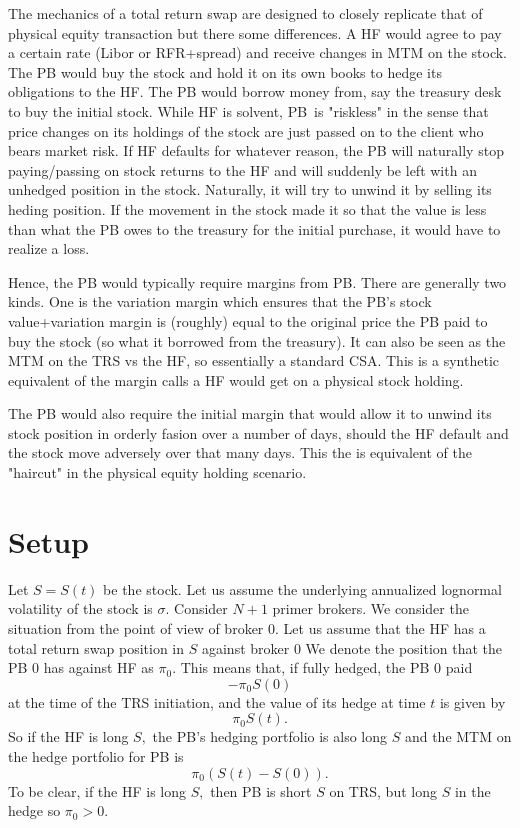 \documentclass{article}
\begin{document}
The mechanics of a total return swap are designed to closely replicate that
of physical equity transaction but there some differences. A HF would agree
to pay a certain rate (Libor or RFR+spread) and receive changes in MTM on
the stock. The PB would buy the stock and hold it on its own books to hedge
its obligations to the HF. The PB would borrow money from, say the treasury
desk to buy the initial stock. While HF is solvent, PB\ is "riskless" in the
sense that price changes on its holdings of the stock are just passed on to
the client who bears market risk. If HF defaults for whatever reason, the PB
will naturally stop paying/passing on stock returns to the HF and will
suddenly be left with an unhedged position in the stock. Naturally, it will
try to unwind it by selling its heding position. If the movement in the
stock made it so that the value is less than what the PB owes to the
treasury for the initial purchase, it would have to realize a loss. 

Hence, the PB would typically require margins from PB. There are generally
two kinds. One is the variation margin which ensures that the PB's stock
value+variation margin is (roughly) equal to the original price the PB paid
to buy the stock (so what it borrowed from the treasury). It can also be
seen as the MTM on the TRS vs the HF, so essentially a standard CSA. This is
a synthetic equivalent of the margin calls a HF would get on a physical
stock holding. 

The PB would also require the initial margin that would allow it to unwind
its stock position in orderly fasion over a number of days, should the HF
default and the stock move adversely over that many days. This the is
equivalent of the "haircut" in the physical equity holding scenario.

\section{Setup}

Let $S=S(t)$ be the stock. Let us assume the underlying annualized lognormal
volatility of the stock is $\sigma $. Consider $N+1$ primer brokers. We
consider the situation from the point of view of broker $0.$ Let us assume
that the HF has a total return swap position in $S$ against broker $0$ We
denote the position that the PB $0$ has against HF as $\pi _{0}.$ This means
that, if fully hedged, the PB $0$ paid%
\[
-\pi _{0}S(0)
\]%
at the time of the TRS initiation, and the value of its hedge at time $t$ is
given by%
\[
\pi _{0}S(t).
\]%
So if the HF is long $S,$ the PB's hedging portfolio is also long $S$ and
the MTM on the hedge portfolio for PB is%
\[
\pi _{0}\left( S(t)-S(0)\right) .
\]%
To be clear, if the HF is long $S,$ then PB is short $S$ on TRS, but long $S$
in the hedge so $\pi _{0}>0.$
\end{document}
